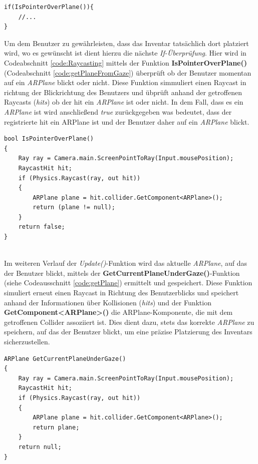 \begin{lstlisting}[style=csharp, caption={Raycasting}, label=code:Raycasting]
if(IsPointerOverPlane()){
    //...
}
\end{lstlisting}
Um dem Benutzer zu gewährleisten, dass das Inventar tatsächlich dort platziert wird, wo es gewünscht ist dient hierzu
die nächste \textit{If-Überprüfung}. Hier wird in Codeabschnitt \ref{code:Raycasting} mittels der Funktion \textbf{IsPointerOverPlane()}
(Codeabschnitt \ref{code:getPlaneFromGaze}) überprüft ob der Benutzer momentan auf ein \textit{ARPlane} blickt oder nicht. Diese Funktion
simmuliert einen Raycast in richtung der Blickrichtung des Benutzers und übprüft anhand der getroffenen Raycasts (\textit{hits})
ob der hit ein \textit{ARPlane} ist oder nicht. In dem Fall, dass es ein \textit{ARPlane} ist wird anschließend \textit{true}
zurückgegeben was bedeutet, dass der registrierte hit ein ARPlane ist und der Benutzer daher auf ein \textit{ARPlane} blickt.

\begin{lstlisting}[style=csharp, caption={Blick-Ueberpreufungs Funktion}, label=code:getPlaneFromGaze]
bool IsPointerOverPlane()
{
    Ray ray = Camera.main.ScreenPointToRay(Input.mousePosition);
    RaycastHit hit;
    if (Physics.Raycast(ray, out hit))
    {
        ARPlane plane = hit.collider.GetComponent<ARPlane>();
        return (plane != null);
    }
    return false;
}
\end{lstlisting}\\

Im weiteren Verlauf der \textit{Update()}-Funktion wird das aktuelle \textit{ARPlane}, auf das der Benutzer blickt, mittels
der \textbf{GetCurrentPlaneUnderGaze()}-Funktion (siehe Codeausschnitt \ref{code:getPlane}) ermittelt und gespeichert.
Diese Funktion simuliert erneut einen Raycast in Richtung des Benutzerblicks und speichert anhand der Informationen über
Kollisionen (\textit{hits}) und der Funktion \textbf{GetComponent<ARPlane>()} die ARPlane-Komponente, die mit dem
getroffenen Collider assoziiert ist. Dies dient dazu, stets das korrekte \textit{ARPlane} zu speichern, auf das der
Benutzer blickt, um eine präzise Platzierung des Inventars sicherzustellen.

\begin{lstlisting}[style=csharp, caption={Das gewollte ARPlane ermitteln}, label=code:getPlane]
ARPlane GetCurrentPlaneUnderGaze()
{
    Ray ray = Camera.main.ScreenPointToRay(Input.mousePosition);
    RaycastHit hit;
    if (Physics.Raycast(ray, out hit))
    {
        ARPlane plane = hit.collider.GetComponent<ARPlane>();
        return plane;
    }
    return null;
}
\end{lstlisting}

